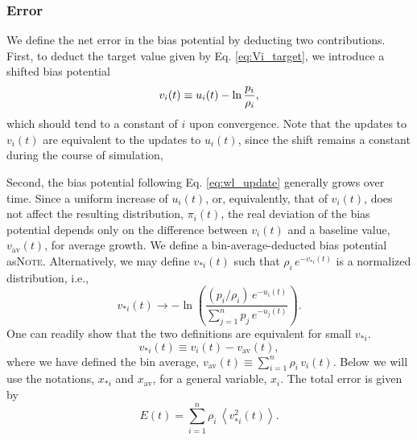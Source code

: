 \documentclass[reprint, superscriptaddress, floatfix]{revtex4-1}
\newcommand{\note}[1]{{\color{DarkGreen}\footnotesize \textsc{Note.} #1}}
\newcommand{\Err}{E}
\newcommand{\bav}[1]{#1_\mathrm{av}}
\begin{document}
\subsubsection{Error}



We define the net error in the bias potential
by deducting two contributions.
%
First, to deduct the target value given by
Eq. \eqref{eq:Vi_target},
we introduce a shifted bias potential
%
\begin{equation}
  v_i(t)
  \equiv
  u_i(t)
  -
  \ln \frac { p_i }
            { \rho_i }
  ,
  \notag
\end{equation}
%
which should tend to a constant of $i$
upon convergence.
Note that the updates to $v_i(t)$ are
equivalent to the updates to $u_i(t)$,
since the shift
remains a constant during the course of simulation,


Second, the bias potential following Eq. \eqref{eq:wl_update}
generally grows over time.
%
Since a uniform increase of $u_i(t)$, or, equivalently, that of $v_i(t)$,
does not affect the resulting distribution, $\pi_i(t)$,
the real deviation of the bias potential
depends only on the difference between $v_i(t)$
and a baseline value, $\bav{v}(t)$,
for average growth\cite{
dama2014}.
%
We define a bin-average-deducted bias potential
as\note{Alternatively,
we may define $v_{*i}(t)$ such that
$\rho_i \, e^{-v_{*i}(t)}$ is a normalized distribution,
i.e.,
$$
v_{*i}(t) \to -\ln\left(
  \frac{ (p_i/\rho_i) \, e^{ -u_i(t) } }
  { \sum_{j=1}^n p_j \, e^{ -u_j(t) } }
\right).
$$
One can readily show that the two definitions are equivalent
for small $v_{*i}$.}
%
\begin{equation}
  v_{*i}(t) \equiv v_i(t) - \bav{v}(t)
  ,
\label{eq:x_def}
\end{equation}
%
where we have defined the bin average,
$\bav{v}(t) \equiv \sum_{i=1}^n \rho_i \, v_i(t)$.
%
%
Below we will use the notations, $x_{*i}$ and $\bav{x}$,
for a general variable, $x_i$.
%
The total error is given by
%
\begin{equation}
  \Err(t)
  =
  \sum_{i = 1}^n \rho_i \,
  \left\langle v_{*i}^2(t) \right\rangle
  .
\label{eq:error_def}
\end{equation}
\end{document}
